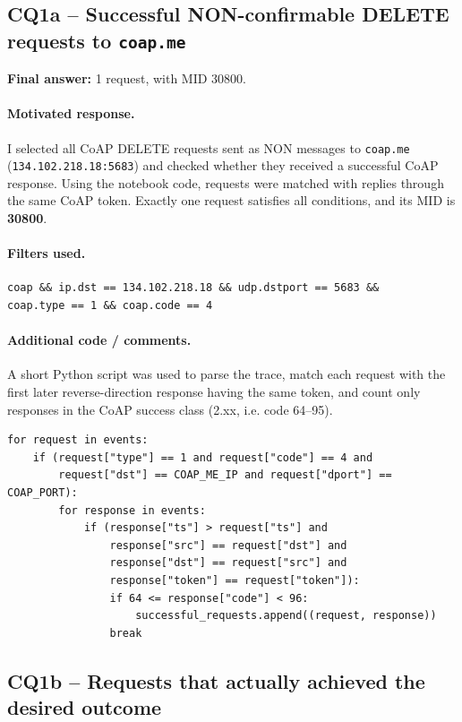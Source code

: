 \documentclass[11pt,a4paper]{article}
\begin{document}
\subsection*{CQ1a -- Successful NON-confirmable DELETE requests to \texttt{coap.me}}

\textbf{Final answer:} 1 request, with MID 30800.

\paragraph{Motivated response.}
I selected all CoAP DELETE requests sent as NON messages to \texttt{coap.me}
(\texttt{134.102.218.18:5683}) and checked whether they received a successful CoAP response.
Using the notebook code, requests were matched with replies through the same CoAP token.
Exactly one request satisfies all conditions, and its MID is \textbf{30800}.

\paragraph{Filters used.}
\begin{verbatim}
coap && ip.dst == 134.102.218.18 && udp.dstport == 5683 &&
coap.type == 1 && coap.code == 4
\end{verbatim}

\paragraph{Additional code / comments.}
A short Python script was used to parse the trace, match each request with the first later
reverse-direction response having the same token, and count only responses in the CoAP
success class (2.xx, i.e. code 64--95).

\begin{verbatim}
for request in events:
    if (request["type"] == 1 and request["code"] == 4 and
        request["dst"] == COAP_ME_IP and request["dport"] == COAP_PORT):
        for response in events:
            if (response["ts"] > request["ts"] and
                response["src"] == request["dst"] and
                response["dst"] == request["src"] and
                response["token"] == request["token"]):
                if 64 <= response["code"] < 96:
                    successful_requests.append((request, response))
                break
\end{verbatim}
\subsection*{CQ1b -- Requests that actually achieved the desired outcome}
\end{document}
